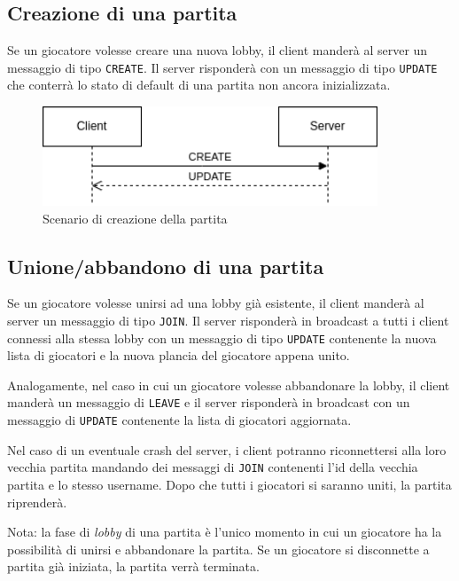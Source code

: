 \documentclass[a4paper,12pt]{article}
\begin{document}
\subsection{Creazione di una partita}

Se un giocatore volesse creare una nuova lobby, il client manderà al server
un messaggio di tipo \texttt{CREATE}. Il server risponderà con un messaggio
di tipo \texttt{UPDATE} che conterrà lo stato di default di una partita non
ancora inizializzata.

\begin{figure}[htb]
  \centering
  \includegraphics[width=10cm]{create.png}
  \caption{Scenario di creazione della partita}%
  \label{fig:create}
\end{figure}

\subsection{Unione/abbandono di una partita}

Se un giocatore volesse unirsi ad una lobby già esistente, il client manderà
al server un messaggio di tipo \texttt{JOIN}. Il server risponderà in
broadcast a tutti i client connessi alla stessa lobby con un messaggio di
tipo \texttt{UPDATE} contenente la nuova lista di giocatori e la nuova
plancia del giocatore appena unito.

Analogamente, nel caso in cui un giocatore volesse abbandonare la lobby, il
client manderà un messaggio di \texttt{LEAVE} e il server risponderà in
broadcast con un messaggio di \texttt{UPDATE} contenente la lista di
giocatori aggiornata.

Nel caso di un eventuale crash del server, i client potranno riconnettersi alla
loro vecchia partita mandando dei messaggi di \texttt{JOIN} contenenti l'id
della vecchia partita e lo stesso username. Dopo che tutti i giocatori si
saranno uniti, la partita riprenderà.

Nota: la fase di \textit{lobby} di una partita è l'unico momento in cui un
giocatore ha la possibilità di unirsi e abbandonare la partita. Se un
giocatore si disconnette a partita già iniziata, la partita verrà terminata.
\end{document}
